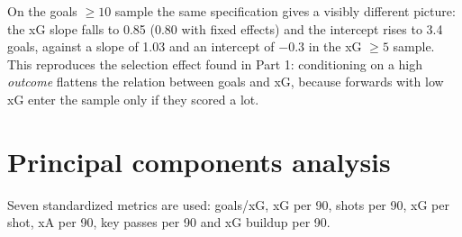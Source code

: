 \documentclass[11pt,a4paper]{article}
\begin{document}
\begin{table}
\begin{center}
{}
\caption{Goals on xG, shots, minutes and position (goals $\geq$ 10 sample)}
\label{tab:p2_reg_goals_g10}
\end{center}
\end{table}

On the goals $\geq 10$ sample the same specification gives a visibly different picture: the xG slope falls to 0.85 (0.80 with fixed effects) and the intercept rises to 3.4 goals, against a slope of 1.03 and an intercept of $-0.3$ in the xG $\geq 5$ sample. This reproduces the selection effect found in Part 1: conditioning on a high \emph{outcome} flattens the relation between goals and xG, because forwards with low xG enter the sample only if they scored a lot.

\section{Principal components analysis}

Seven standardized metrics are used: goals/xG, xG per 90, shots per 90, xG per shot, xA per 90, key passes per 90 and xG buildup per 90.
\end{document}
